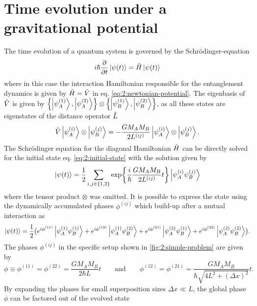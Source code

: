 \section{Time evolution under a gravitational potential}\label{sec:2:time-evolution}

The time evolution of a quantum system is governed by the Schrödinger-equation
\begin{equation}
  i\hbar \pdv{t} \ket{\psi(t)} = \hat{H} \ket{\psi(t)}
\end{equation}
where in this case the interaction Hamiltonian responsible for the entanglement dynamics is given by $\hat{H} = \hat{V}$ in eq. \eqref{eq:2:newtonian-potential}.
The eigenbasis of $\hat{V}$ is given by $\left\{ \ket{\psi_A^{(1)}}, \ket{\psi_A^{(2)}} \right\}\otimes \left\{ \ket{\psi_B^{(1)}}, \ket{\psi_B^{(2)}} \right\}$, as all these states are eigenstates of the distance operator $\hat{L}$
\begin{equation}
  \hat{V} \ket{\psi^{(i)}_A} \otimes \ket{\psi^{(j)}_B} = -\frac{G M_A M_B}{2L^{(ij)}} \ket{\psi^{(i)}_A} \otimes \ket{\psi^{(j)}_B} .
\end{equation}
The Schrödinger equation for the diagonal Hamiltonian $\hat{H}$ can be directly solved for the initial state eq. \eqref{eq:2:initial-state} with the solution given by 
\begin{equation}
  \ket{\psi(t)} = \frac{1}{2} \sum_{i,j\in\{1,2\}} \exp{\frac{i}{\hbar} \frac{G M_A M_B}{2L^{(ij)}} t} \ket{\psi^{(i)}_A \psi^{(j)}_B}
\end{equation}
where the tensor product $\otimes$ was omitted.
It is possible to express the state using the dynamically accumulated phases $\phi^{(ij)}$ which build-up after a mutual interaction as
\begin{equation}\label{eq:2:evolved-state}
  \ket{\psi(t)} = \frac{1}{2}\bigl(
    e^{i\phi^{(11)}} \ket{\psi_A^{(1)} \psi_B^{(1)}} 
    + e^{i\phi^{(12)}} \ket{\psi_A^{(1)} \psi_B^{(2)}}
    + e^{i\phi^{(21)}} \ket{\psi_A^{(2)} \psi_B^{(1)}} 
    + e^{i\phi^{(22)}} \ket{\psi_A^{(2)} \psi_B^{(2)}} \bigr) .
\end{equation}
The phases $\phi^{(ij)}$ in the specific setup shown in \cref{fig:2:simple-problem} are given by
\begin{equation}
  \phi \equiv \phi^{(11)} = \phi^{(22)} = \frac{G M_A M_B}{2\hbar L}t 
  \qquad \text{and} \qquad 
  \phi^{(12)} = \phi^{(21)} = \frac{G M_A M_B}{\hbar \sqrt{4L^2 + (\Delta x)^2}}t .
\end{equation}
By expanding the phases for small superposition sizes $\Delta x \ll L$, the global phase $\phi$ can be factored out of the evolved state
